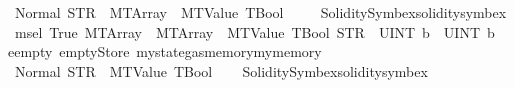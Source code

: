 \begin{isabellebody}
{\isacharequal}{\kern0pt}\ Normal\ {\isacharparenleft}{\kern0pt}{\isacharparenleft}{\kern0pt}STR\ {\isacharprime}{\kern0pt}{\isacharprime}{\kern0pt}{}{\isachardot}{\kern0pt}{}{\isacharprime}{\kern0pt}{\isacharprime}{\kern0pt}{\isacharcomma}{\kern0pt}\ MTArray\ {}\ {\isacharparenleft}{\kern0pt}MTValue\ TBool{\isacharparenright}{\kern0pt}{\isacharparenright}{\kern0pt}{\isacharcomma}{\kern0pt}\ {}{\isacharparenright}{\kern0pt}{\isachardoublequoteclose}%
\isadelimproof
\ \ %
\endisadelimproof
%
\isatagproof
{}\isamarkupfalse%
\ Solidity{\isacharunderscore}{\kern0pt}Symbex{\isachardot}{\kern0pt}solidity{\isacharunderscore}{\kern0pt}symbex%
\endisatagproof
{\isafoldproof}%
%
\isadelimproof
%
\endisadelimproof
\isanewline
\isanewline
{}\isamarkupfalse%
\ {\isachardoublequoteopen}msel\ True\ {\isacharparenleft}{\kern0pt}MTArray\ {}\ {\isacharparenleft}{\kern0pt}MTArray\ {}\ {\isacharparenleft}{\kern0pt}MTValue\ TBool{\isacharparenright}{\kern0pt}{\isacharparenright}{\kern0pt}{\isacharparenright}{\kern0pt}\ {\isacharparenleft}{\kern0pt}STR\ {\isacharprime}{\kern0pt}{\isacharprime}{\kern0pt}{}{\isacharprime}{\kern0pt}{\isacharprime}{\kern0pt}{\isacharparenright}{\kern0pt}\ {\isacharbrackleft}{\kern0pt}UINT\ b{}\ {}{\isacharcomma}{\kern0pt}\ UINT\ b{}\ {}{\isacharbrackright}{\kern0pt}\ eempty\ emptyStore\ {\isacharparenleft}{\kern0pt}mystate{\isasymlparr}gas{\isacharcolon}{\kern0pt}{\isacharequal}{\kern0pt}{}{\isacharcomma}{\kern0pt}memory{\isacharcolon}{\kern0pt}{\isacharequal}{\kern0pt}mymemory{}{\isasymrparr}{\isacharparenright}{\kern0pt}\ {}\isanewline
{\isacharequal}{\kern0pt}\ Normal\ {\isacharparenleft}{\kern0pt}{\isacharparenleft}{\kern0pt}STR\ {\isacharprime}{\kern0pt}{\isacharprime}{\kern0pt}{}{\isachardot}{\kern0pt}{}{\isacharprime}{\kern0pt}{\isacharprime}{\kern0pt}{\isacharcomma}{\kern0pt}\ MTValue\ TBool{\isacharparenright}{\kern0pt}{\isacharcomma}{\kern0pt}\ {}{\isacharparenright}{\kern0pt}{\isachardoublequoteclose}%
\isadelimproof
\ %
\endisadelimproof
%
\isatagproof
{}\isamarkupfalse%
\ Solidity{\isacharunderscore}{\kern0pt}Symbex{\isachardot}{\kern0pt}solidity{\isacharunderscore}{\kern0pt}symbex%
\endisatagproof
{\isafoldproof}%
%
\isadelimproof
%
\endisadelimproof
\isanewline
\isanewline
{}\isamarkupfalse%

\end{isabellebody}

